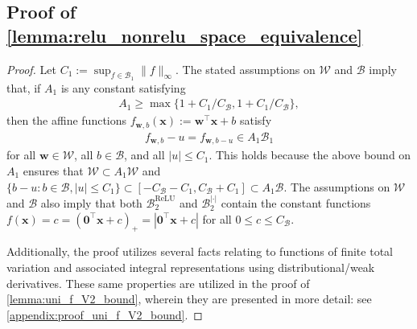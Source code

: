 \documentclass{article}
\DeclareMathOperator{\ReLU}{\mathrm{ReLU}}
\def\vw{{\bm{w}}}
\def\vx{{\bm{x}}}
\def\cB{{\mathcal{B}}}
\def\cW{{\mathcal{W}}}
\begin{document}
\begin{appendices}
\subsection{Proof of \cref{lemma:relu_nonrelu_space_equivalence}} \label{appendix:proof_relu_nonrelu_space_equivalence}
\begin{proof}
    Let $C_1 := \sup_{f \in \cB_1} \| f \|_\infty$. The stated assumptions on $\cW$ and $\cB$ imply that, if $A_1$ is any constant satisfying
    \begin{align} \label{eq:A1_bounds}
        A_1 \geq \max \{ 1+ C_1/C_{\cB}, 1+C_1/C_{\cB} \},
    \end{align}
    then the affine functions $f_{\vw,b}(\vx) := \vw^\top \vx + b$ satisfy
    \begin{align} \label{eq:rescaled_linear_containment}
            f_{\vw,b} - u = f_{\vw,b-u} \in A_1 \cB_1
    \end{align}
    for all $\vw \in \cW$, all $b \in \cB$, and all $|u| \leq C_1$. This holds because the above bound on $A_1$ ensures that $\cW \subset A_1 \cW$ and $\{ b-u: b \in \cB, |u| \leq C_1 \} \subset [-C_{\cB} - C_1, C_{\cB} + C_1] \subset A_1 \cB$. The assumptions on $\cW$ and $\cB$ also imply that both $\cB_2^{\ReLU}$ and $\cB_2^{|\cdot|}$ contain the constant functions $f(\vx) = c = (\bm{0}^\top \vx + c)_+ = | \bm{0}^\top \vx + c | $ for all $0 \leq c \leq C_{\cB}$. 
    
    Additionally, the proof utilizes several facts relating to functions of finite total variation and associated integral representations using distributional/weak derivatives. These same properties are utilized in the proof of \cref{lemma:uni_f_V2_bound}, wherein they are presented in more detail: see \cref{appendix:proof_uni_f_V2_bound}.
    

\end{proof}
\end{appendices}
\end{document}
